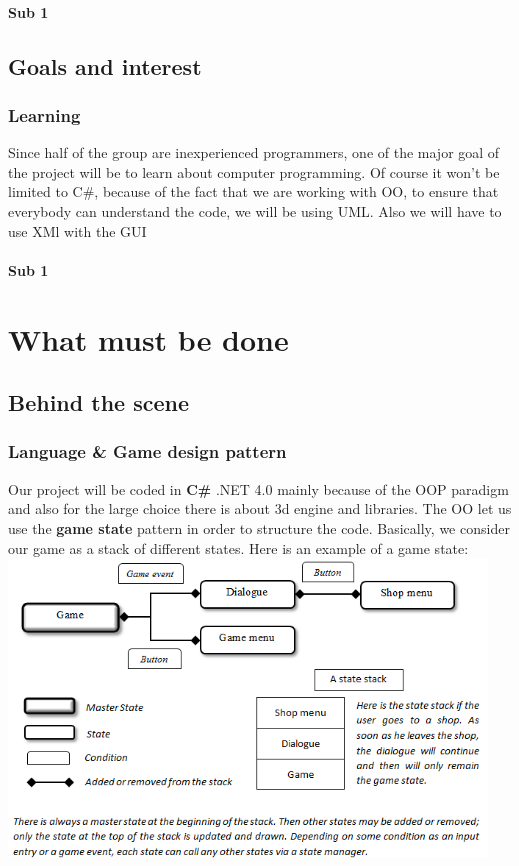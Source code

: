 \documentclass[article]{report}
\begin{document}
									  \subsection{Sub 1}
						\chapter{Goals and interest}
								\section{Learning}
										Since half of the group are inexperienced programmers, one of the major goal of the project will be to learn about computer programming.\newline
										Of course it won't be limited to C\#, because of the fact that we are working with OO, to ensure that everybody can understand the code, we will be using UML.\newline
										Also we will have to use XMl with the GUI
									  \subsection{Sub 1}
     		\part{What must be done}
     			\chapter{Behind the scene}
     					\section{Language \& Game design pattern}
     						Our project will be coded in \textbf{C\#} .NET 4.0 mainly because of the \ac{OOP} paradigm and also for the large choice there is about 3d engine and libraries. The OO let us use the \textbf{game state} pattern in order to structure the code. Basically, we consider our game as a stack of different states. Here is an example of a game state:\newline
     						\includegraphics[height=300px]{GameStateDesign.png}\\
     						
\end{document}
